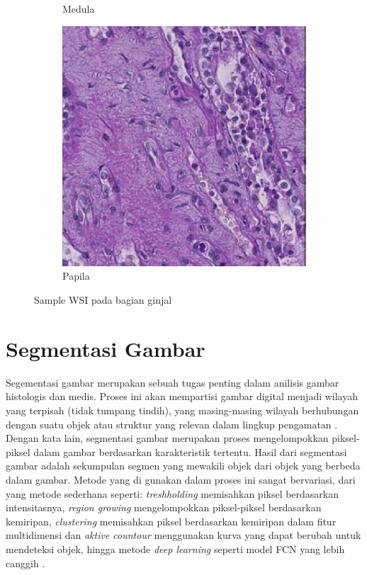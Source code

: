 \begin{figure}[h]
\begin{subfigure}[b]{0.3\textwidth}
		\caption{Medula}
		\label{fig:medula}
	\end{subfigure}
	\hfill
	\begin{subfigure}[b]{0.3\textwidth}
		\centering
		\includegraphics[width=\textwidth]{gambar/papila.png}
		\caption{Papila}
		\label{fig:papila}
	\end{subfigure}
	\caption{Sample WSI pada bagian ginjal \cite{howard_hubmap_2023}}
	\label{fig:ginjal}
\end{figure}

 
\section{Segmentasi Gambar}

\noindent Segementasi gambar merupakan sebuah tugas penting dalam anilisis gambar histologis dan medis. Proses ini akan mempartisi gambar digital menjadi wilayah yang terpisah (tidak tumpang tindih), yang masing-masing wilayah  berhubungan dengan suatu objek atau struktur yang relevan dalam lingkup pengamatan \cite{wu_image_2023}. Dengan kata lain, segmentasi gambar merupakan proses mengelompokkan piksel-piksel dalam gambar berdasarkan karakteristik tertentu. Hasil dari segmentasi gambar adalah sekumpulan segmen yang mewakili objek dari objek yang berbeda dalam gambar. Metode yang di gunakan dalam proses ini sangat bervariasi, dari yang metode sederhana seperti: \textit{treshholding} memisahkan piksel berdasarkan intensitasnya, \textit{region growing} mengelompokkan piksel-piksel berdasarkan kemiripan, \textit{clustering} memisahkan piksel berdasarkan kemiripan dalam fitur multidimensi dan \textit{aktive countour} menggunakan kurva yang dapat berubah untuk mendeteksi objek, hingga metode \textit{deep learning} seperti model FCN yang lebih canggih \cite{huang_fully_2022,wang_comprehensive_2022}.

